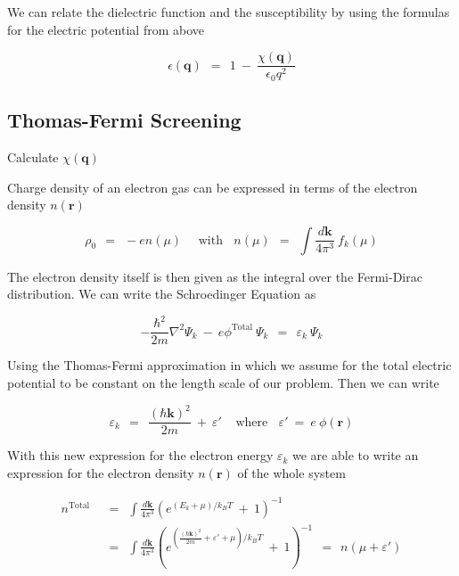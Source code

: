 \documentclass[10pt]{report}
\numberwithin{equation}{chapter}
\begin{document}
We can relate the dielectric function and the susceptibility  by using the formulas for the electric potential from above

\begin{equation}
  \epsilon(\mathbf{q}) ~~=~~ 1 ~-~ \frac{\chi(\mathbf{q})}{\epsilon_0 q^2}
\end{equation}


\subsection{Thomas-Fermi Screening}

Calculate $\chi(\mathbf{q})$


Charge density of an electron gas can be expressed in terms of the electron density $n(\mathbf{r})$

\begin{equation}
  \rho_0 ~~=~~ -e n(\mu) ~~~~~~\text{with}~~~~ 
  n(\mu) ~~=~~ \int \frac{d \mathbf{k}}{4\pi^3}\ f_k(\mu)
\end{equation}

The electron density itself is then given as the integral over the Fermi-Dirac distribution. We can write the Schroedinger Equation as 

\begin{equation} \label{eq:screen_hamiltonian}
  -\frac{\hbar^2}{2m} \nabla^2 \Psi_k ~-~ e\phi^\text{Total}\ \Psi_k ~~=~~ \varepsilon_k\ \Psi_k
\end{equation}

Using the Thomas-Fermi approximation in which we assume for the total electric potential to be constant on the length scale of our problem. Then we can write

\begin{equation}
  \varepsilon_k ~~=~~ \frac{(\hbar \mathbf{k})^2}{2m} ~+~ \varepsilon' ~~~~~\text{where}~~~~
  \varepsilon' ~=~ e\ \phi(\mathbf{r})
\end{equation}

With this new expression for the electron energy $\varepsilon_k$ we are able to write an expression for the electron density $n(\mathbf{r})$ of the whole system

\begin{align}
  n^\text{Total} ~~& =~~ \int \frac{d \mathbf{k}}{4\pi^3} \left(e^{(E_k + \mu)/k_BT} ~+~ 1 \right)^{-1} \nonumber \\
  ~~& =~~ \int \frac{d \mathbf{k}}{4\pi^3} \left(e^{(\frac{(\hbar \mathbf{k})^2}{2m} + \varepsilon' + \mu)/k_BT} ~+~ 1 \right)^{-1} 
  ~~=~~ n(\mu + \varepsilon')
\end{align}
\end{document}

